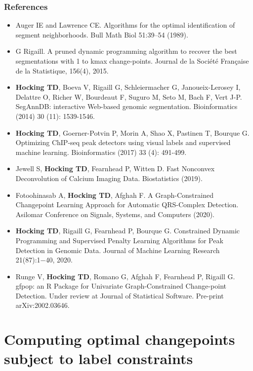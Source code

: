 \documentclass{beamer}
\begin{document}
\begin{frame}
  \frametitle{References}
  \scriptsize
  \begin{itemize}
  \item Auger IE and Lawrence CE. Algorithms for the optimal
    identification of segment neighborhoods. Bull Math Biol 51:39–54
    (1989).
  \item G Rigaill.  A pruned dynamic programming algorithm to recover
    the best segmentations with 1 to kmax change-points. Journal de la
    Société Française de la Statistique, 156(4), 2015. 
  \item \textbf{Hocking TD}, Boeva V, Rigaill G, Schleiermacher G,
    Janoueix-Lerosey I, Delattre O, Richer W, Bourdeaut F, Suguro M,
    Seto M, Bach F, Vert J-P. SegAnnDB: interactive Web-based genomic
    segmentation. Bioinformatics (2014) 30 (11): 1539-1546.
  \item \textbf{Hocking TD}, Goerner-Potvin P, Morin A, Shao X,
    Pastinen T, Bourque G. Optimizing ChIP-seq peak detectors using
    visual labels and supervised machine learning. Bioinformatics
    (2017) 33 (4): 491-499.
  \item Jewell S, \textbf{Hocking TD}, Fearnhead P, Witten D. Fast Nonconvex
    Deconvolution of Calcium Imaging Data. Biostatistics (2019).
  \item Fotoohinasab A, \textbf{Hocking TD}, Afghah F. A
    Graph-Constrained Changepoint Learning Approach for Automatic
    QRS-Complex Detection. Asilomar Conference on Signals, Systems,
    and Computers (2020).
  \item \textbf{Hocking TD}, Rigaill G, Fearnhead P, Bourque G. Constrained
    Dynamic Programming and Supervised Penalty Learning Algorithms for
    Peak Detection in Genomic Data. Journal of Machine Learning
    Research 21(87):1−40, 2020.
  \item Runge V, \textbf{Hocking TD}, Romano G, Afghah F, Fearnhead P, Rigaill
    G. gfpop: an R Package for Univariate Graph-Constrained
    Change-point Detection. Under review at Journal of Statistical
    Software. Pre-print arXiv:2002.03646.
  \end{itemize}
\end{frame}

\section{Computing optimal changepoints subject to label constraints}
\end{document}
